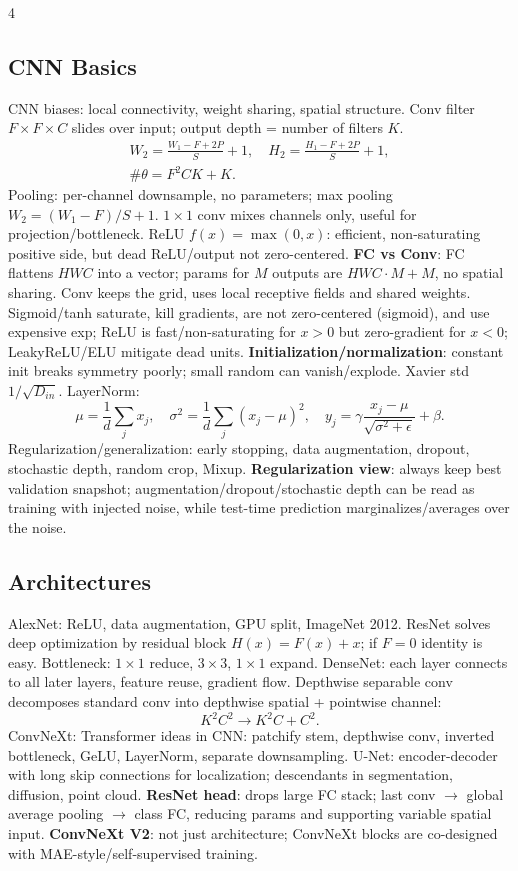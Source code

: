 \documentclass[8pt,a4paper,landscape]{extarticle}
\newcommand{\key}[1]{\textbf{#1}}
\begin{document}
\begin{multicols*}{4}
\subsection{CNN Basics}
CNN biases: local connectivity, weight sharing, spatial structure. Conv filter $F\times F\times C$ slides over input; output depth = number of filters $K$.
\[
\begin{gathered}
W_2=\frac{W_1-F+2P}{S}+1,\quad
H_2=\frac{H_1-F+2P}{S}+1,\\
\#\theta=F^2CK+K.
\end{gathered}
\]
Pooling: per-channel downsample, no parameters; max pooling $W_2=(W_1-F)/S+1$. $1\times1$ conv mixes channels only, useful for projection/bottleneck. ReLU $f(x)=\max(0,x)$: efficient, non-saturating positive side, but dead ReLU/output not zero-centered.
\key{FC vs Conv}: FC flattens $HWC$ into a vector; params for $M$ outputs are $HWC\cdot M+M$, no spatial sharing. Conv keeps the grid, uses local receptive fields and shared weights. Sigmoid/tanh saturate, kill gradients, are not zero-centered (sigmoid), and use expensive exp; ReLU is fast/non-saturating for $x>0$ but zero-gradient for $x<0$; LeakyReLU/ELU mitigate dead units.
\key{Initialization/normalization}: constant init breaks symmetry poorly; small random can vanish/explode. Xavier std $1/\sqrt{D_{in}}$. LayerNorm:
\[
\mu=\frac1d\sum_jx_j,\quad \sigma^2=\frac1d\sum_j(x_j-\mu)^2,\quad y_j=\gamma\frac{x_j-\mu}{\sqrt{\sigma^2+\epsilon}}+\beta.
\]
Regularization/generalization: early stopping, data augmentation, dropout, stochastic depth, random crop, Mixup. \key{Regularization view}: always keep best validation snapshot; augmentation/dropout/stochastic depth can be read as training with injected noise, while test-time prediction marginalizes/averages over the noise.

\subsection{Architectures}
AlexNet: ReLU, data augmentation, GPU split, ImageNet 2012. ResNet solves deep optimization by residual block $H(x)=F(x)+x$; if $F=0$ identity is easy. Bottleneck: $1\times1$ reduce, $3\times3$, $1\times1$ expand. DenseNet: each layer connects to all later layers, feature reuse, gradient flow. Depthwise separable conv decomposes standard conv into depthwise spatial + pointwise channel:
\[
K^2C^2\to K^2C+C^2.
\]
ConvNeXt: Transformer ideas in CNN: patchify stem, depthwise conv, inverted bottleneck, GeLU, LayerNorm, separate downsampling. U-Net: encoder-decoder with long skip connections for localization; descendants in segmentation, diffusion, point cloud. \key{ResNet head}: drops large FC stack; last conv $\to$ global average pooling $\to$ class FC, reducing params and supporting variable spatial input. \key{ConvNeXt V2}: not just architecture; ConvNeXt blocks are co-designed with MAE-style/self-supervised training.


\end{multicols*}
\end{document}
